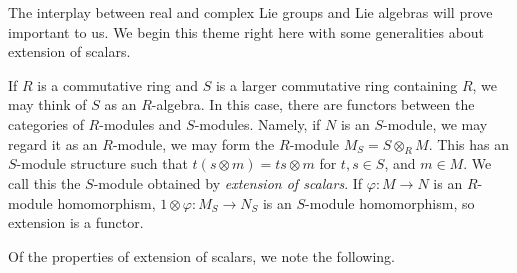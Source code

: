 \documentclass[12pt,reqno]{book}%
\theoremstyle{definition}
\theoremstyle{remark}
\theoremstyle{theorem}
\theoremstyle{remark}
\begin{document}
The interplay between real and complex Lie groups and Lie algebras will prove important to us.
We begin this theme right here with some generalities about extension of scalars.

If $R$ is a commutative ring and $S$ is a larger commutative ring containing $R$, we may think of $S$ as an $R$-algebra.
In this case, there are functors between the categories of $R$-modules and $S$-modules.
Namely, if $N$ is an $S$-module, we may regard it as an $R$-module, we may form the $R$-module $M_S = S \otimes_{R} M$.
This has an $S$-module structure such that $t(s \otimes m) = ts \otimes m$ for $t, s \in S$, and $m \in M$.
We call this the $S$-module obtained by \emph{extension of scalars}.
If $\varphi : M \to N$ is an $R$-module homomorphism, $1 \otimes \varphi : M_S \to N_S$ is an $S$-module homomorphism, so extension is a functor.

Of the properties of extension of scalars, we note the following.
\end{document}
